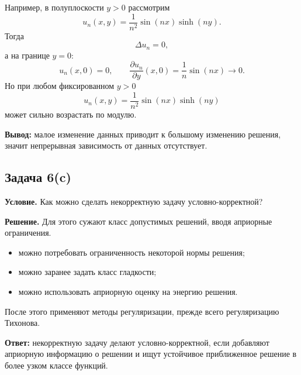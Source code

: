 \documentclass[a4paper,12pt]{article}
\newcommand{\Task}[2]{\subsection*{Задача #1}\textbf{Условие.} #2}
\newcommand{\Solution}{\textbf{Решение.}}
\begin{document}
Например, в полуплоскости $y>0$ рассмотрим
\[
u_n(x,y)=\frac{1}{n^2}\sin(nx)\sinh(ny).
\]
Тогда
\[
\Delta u_n=0,
\]
а на границе $y=0$:
\[
u_n(x,0)=0,
\qquad
\frac{\partial u_n}{\partial y}(x,0)=\frac{1}{n}\sin(nx)\to 0.
\]
Но при любом фиксированном $y>0$
\[
u_n(x,y)=\frac{1}{n^2}\sin(nx)\sinh(ny)
\]
может сильно возрастать по модулю.

\textbf{Вывод:} малое изменение данных приводит к большому изменению решения, значит непрерывная зависимость от данных отсутствует.

\Task{6(c)}{Как можно сделать некорректную задачу условно-корректной?}

\Solution
Для этого сужают класс допустимых решений, вводя априорные ограничения.

\begin{itemize}
  \item можно потребовать ограниченность некоторой нормы решения;
  \item можно заранее задать класс гладкости;
  \item можно использовать априорную оценку на энергию решения.
\end{itemize}

После этого применяют методы регуляризации, прежде всего регуляризацию Тихонова.

\textbf{Ответ:} некорректную задачу делают условно-корректной, если добавляют априорную информацию о решении и ищут устойчивое приближенное решение в более узком классе функций.
\end{document}
